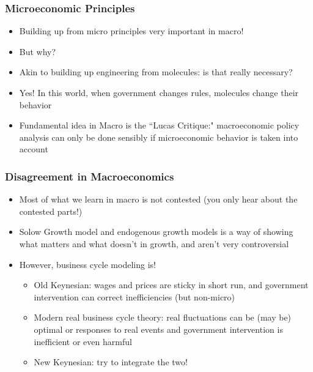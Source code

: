 \documentclass{beamer}
\begin{document}
\begin{frame}
\frametitle[alignment=center]{Microeconomic Principles}
\begin{itemize}
\item Building up from micro principles very important in macro!
\bigskip
\item But why?
\bigskip
\item Akin to building up engineering from molecules:  is that really necessary?
\bigskip
\item Yes!  In this world, when government changes rules, molecules change their behavior
\bigskip
\item Fundamental idea in Macro is the ``Lucas Critique:"  macroeconomic policy analysis can only be done sensibly if microeconomic behavior is taken into account
\end{itemize}
\end{frame}


\begin{frame}
\frametitle[alignment=center]{Disagreement in Macroeconomics}
\begin{itemize}
\item Most of what we learn in macro is not contested (you only hear about the contested parts!)
\bigskip
\item Solow Growth model and endogenous growth models is a way of showing what matters and what doesn't in growth, and aren't very controversial
\bigskip
\item However, business cycle modeling is!  
\begin{itemize}
\item Old Keynesian:  wages and prices are sticky in short run, and government intervention can correct inefficiencies (but non-micro)
\item Modern real business cycle theory:  real fluctuations can be (may be) optimal or responses to real events and government intervention is inefficient or even harmful
\item New Keynesian:  try to integrate the two!
\end{itemize}
\end{itemize}
\end{frame}
\end{document}
